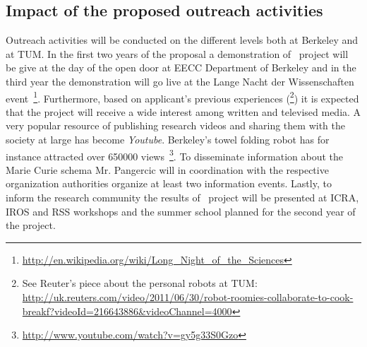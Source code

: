 \subsection{Impact of the proposed outreach activities}
Outreach activities will be conducted on the different levels both at Berkeley
and at TUM. In the first two years of the proposal a demonstration of \ksem\
project will be give at the day of the open door at EECC Department of Berkeley and
in the third year the demonstration will go live at the Lange Nacht der Wissenschaften
event~\footnote{\url{http://en.wikipedia.org/wiki/Long_Night_of_the_Sciences}}.
Furthermore, based on applicant's previous experiences (\footnote{See Reuter's piece about
the personal robots at TUM: 
\url{http://uk.reuters.com/video/2011/06/30/robot-roomies-collaborate-to-cook-breakf?videoId=216643886&videoChannel=4000}}) 
it is expected that the project will receive a wide interest among written and televised media.
A very popular resource of publishing research videos and sharing them with the society at large
has become \emph{Youtube}. Berkeley's towel folding robot has for instance attracted over 650000 
views~\footnote{\url{http://www.youtube.com/watch?v=gy5g33S0Gzo}}. To disseminate information about
the Marie Curie schema Mr. Pangercic will in coordination with the respective organization authorities
organize at least two information events. Lastly, to inform the research community the results of 
\ksem\ project will be presented at ICRA, IROS and RSS workshops and the summer school planned for
the second year of the project.
 
\newpage